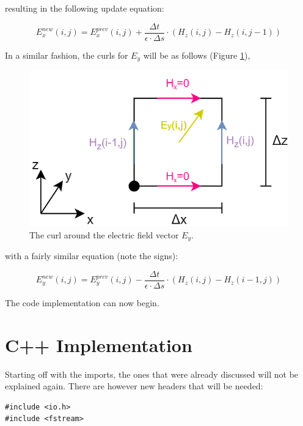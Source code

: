 resulting in the following update equation:

\begin{equation}
	\label{eqn:2dExCurlFinal}
	E_x^{new}(i,j) =  E_x^{prev}(i,j) + \frac{\Delta t}{\epsilon \cdot \Delta s} \cdot (H_z(i,j) - H_z(i,j-1))
\end{equation}

In a similar fashion, the curls for $E_y$ will be as follows (Figure \ref{fig:fdtd2dEy}),

\begin{figure}[h!]
	\centering
	\includegraphics[scale=0.6]{Figures/fdtd2dEy}
	\decoRule
	\caption[2D TE Mode - $E_y$ vector curl]{The curl around the electric field vector $E_y$.}
	\label{fig:fdtd2dEy}
\end{figure}

with a fairly similar equation (note the signs):

\begin{equation}
	\label{eqn:2dEyCurlFinal}
	E_y^{new}(i,j) =  E_y^{prev}(i,j) - \frac{\Delta t}{\epsilon \cdot \Delta s} \cdot (H_z(i,j) - H_z(i-1,j))
\end{equation}

The code implementation can now begin.

\section{C++ Implementation}

Starting off with the imports, the ones that were already discussed will not be explained again. There are however new headers that will be needed:

\begin{verbatim}
#include <io.h>
#include <fstream>
\end{verbatim}

